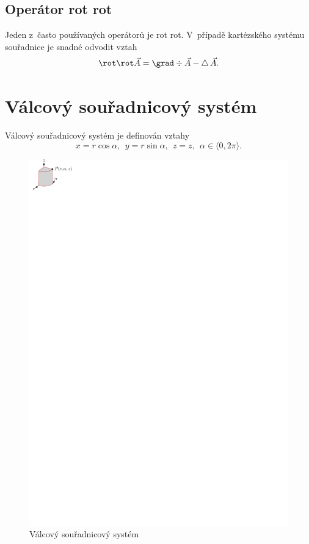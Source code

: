 \subsection*{Operátor rot rot}

Jeden z~často používaných operátorů je rot rot. V~případě kartézského systému souřadnice je snadné odvodit vztah
$$
\rot \rot \vec A = \grad \div \vec A - \triangle\,\vec A.
$$

\section{Válcový souřadnicový systém}

Válcový souřadnicový systém je definován vztahy
$$
x = r\cos \alpha,\ \ y = r \sin \alpha,\ \ z = z,\ \ \alpha \in \langle 0,2\pi \rangle.
$$

\begin{figure}[!hbt]
\centering
\includegraphics[]{prilohy/vektorova_analyza/valcovy.pdf}
\caption{Válcový souřadnicový systém}
\label{fig:vektorova_analyza_valcovy}
\end{figure}


